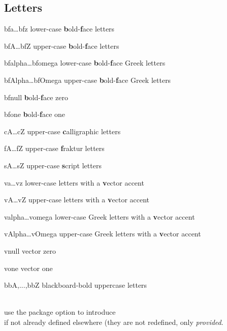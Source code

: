 \documentclass[english,a4paper,DIV=12,parskip=full,oneside]{scrartcl}
\begin{document}
    \subsection{Letters}
        \label{subsec:letters}
    \begin{commandlist}
        \item[bfa\ldots bfz] lower-case \textbf{b}old-\textbf{f}ace letters \mathCodeExample{\bfr, \bff}
        \item[bfA\ldots bfZ] upper-case \textbf{b}old-\textbf{f}ace letters \mathCodeExample{\bfR, \bfF}
        \item[bfalpha\ldots bfomega] lower-case \textbf{b}old-\textbf{f}ace Greek letters \mathCodeExample{\bfalpha,\bfeta}
        \item[bfAlpha\ldots bfOmega] upper-case \textbf{b}old-\textbf{f}ace Greek letters \mathCodeExample{\bfGamma,\bfDelta}
        \item[bfnull] \textbf{b}old-\textbf{f}ace zero \mathCodeExample{\bfnull}
        \item[bfone] \textbf{b}old-\textbf{f}ace one \mathCodeExample{\bfone}
        \item[cA\ldots cZ] upper-case \textbf{c}alligraphic letters \mathCodeExample{\cM, \cN}\\
        \item[fA\ldots fZ] upper-case \textbf{f}raktur letters \mathCodeExample{\fM, \fN, \fX}\\
        \item[sA\ldots sZ] upper-case \textbf{s}cript letters \mathCodeExample{\sM, \sN, \sX}\\
        \item[va\ldots vz] lower-case letters with a \textbf{v}ector accent \mathCodeExample{\va,\vb}
        \item[vA\ldots vZ] upper-case letters with a \textbf{v}ector accent \mathCodeExample{\vA,\vB}
        \item[valpha\ldots vomega] lower-case Greek letters with a \textbf{v}ector accent \mathCodeExample{\valpha,\vbeta}
        \item[vAlpha\ldots vOmega] upper-case Greek letters with a \textbf{v}ector accent \mathCodeExample{\vGamma,\vDelta}
        \item[vnull] vector zero \mathCodeExample{\vnull}
        \item[vone] vector one \mathCodeExample{\vone}
        \item[bbA,...,bbZ] blackboard-bold uppercase letters\par\mathCodeExample{\bbC,\bbK,\bbN,\bbQ,\bbR,\bbS,\bbZ}
        \\[.5\baselineskip] use the package option  to introduce\\
        \mathCodeExample{\C,\K,\N,\Q,\R,\Z} if not already defined elsewhere (\ie they are not redefined, only \emph{provided}.
    \end{commandlist}
\end{document}
